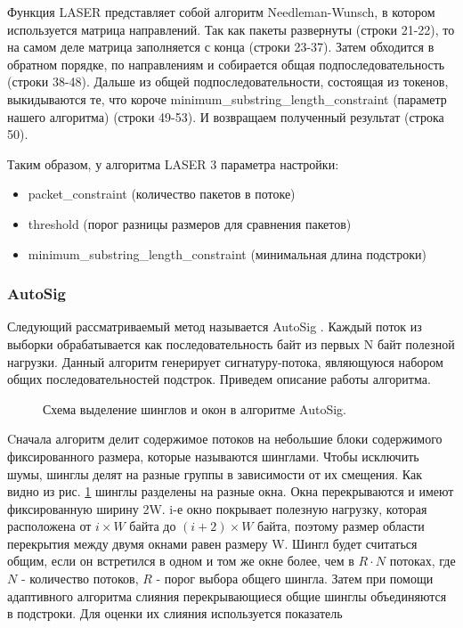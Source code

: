 Функция LASER представляет собой алгоритм Needleman-Wunsch, в котором используется матрица направлений.
Так как пакеты развернуты (строки 21-22), то на самом деле матрица заполняется с конца (строки 23-37).
Затем обходится в обратном порядке, по направлениям и собирается общая подпоследовательность (строки 38-48).
Дальше из общей подпоследовательности, состоящая из токенов, выкидываются те, что короче minimum\_substring\_length\_constraint (параметр нашего алгоритма) (строки 49-53).
И возвращаем полученный результат (строка 50).

Таким образом, у алгоритма LASER 3 параметра настройки:
\begin{itemize}
    \item packet\_constraint (количество пакетов в потоке)
    \item threshold (порог разницы размеров для сравнения пакетов)
    \item minimum\_substring\_length\_constraint (минимальная длина подстроки)
\end{itemize}

\subsubsection{AutoSig}

Следующий рассматриваемый метод называется AutoSig \cite{ye2009autosig, santosautomatic}.
Каждый поток из выборки обрабатывается как последовательность байт из первых N байт полезной нагрузки.
Данный алгоритм генерирует сигнатуру-потока, являющуюся набором общих последовательностей подстрок.
Приведем описание работы алгоритма.

\begin{figure}[h!]
    \begin{center}
        
        \caption{Схема выделение шинглов и окон в алгоритме AutoSig.}\label{autosig:shingles}
    \end{center}
\end{figure}


Cначала алгоритм делит содержимое потоков на небольшие блоки содержимого фиксированного размера, которые называются шинглами.
Чтобы исключить шумы, шинглы делят на разные группы в зависимости от их смещения. Как видно из рис. \ref{autosig:shingles} шинглы разделены на разные окна.
Окна перекрываются и имеют фиксированную ширину 2W. i-е окно покрывает полезную нагрузку, которая расположена от $i \times W$ байта до $(i+2) \times W$ байта,
поэтому размер области перекрытия между двумя окнами равен размеру W. Шингл будет считаться общим, если он встретился в одном и том же окне более, чем в $R \cdot N$ потоках,
где $N$ - количество потоков, $R$ - порог выбора общего шингла. Затем при помощи адаптивного алгоритма слияния перекрывающиеся общие шинглы объединяются в подстроки.
Для оценки их слияния используется показатель

